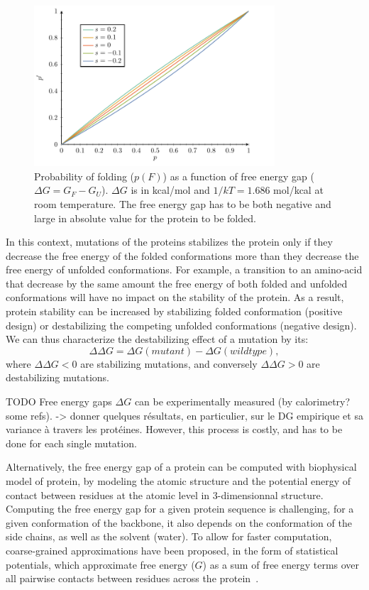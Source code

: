 \begin{figure}[H]
    \centering
    \includegraphics[width=0.8\textwidth, page=5] {figures.pdf}
    \caption[Probability of folding]{
    Probability of folding ($p(F)$) as a function of free energy gap ($\Delta G = G_F - G_U$).
    $\Delta G$ is in kcal/mol and $1/kT=1.686$ mol/kcal at room temperature.
    The free energy gap has to be both negative and large in absolute value for the protein to be folded.
    }
	\label{fig:intro-proba-folding}
\end{figure}

In this context, mutations of the proteins stabilizes the protein only if they decrease the free energy of the folded conformations more than they decrease the free energy of unfolded conformations.
For example, a {transition} to an amino-acid that decrease by the same amount the free energy of both folded and unfolded conformations will have no impact on the stability of the protein.
As a result, protein stability can be increased by stabilizing folded conformation (positive design) or destabilizing the competing unfolded conformations (negative design).
We can thus characterize the destabilizing effect of a mutation by its:
\begin{equation}
    \Delta \Delta G = \Delta G(mutant) - \Delta G(wild type),
\end{equation}
where $\Delta \Delta G <0 $ are stabilizing mutations, and conversely $\Delta \Delta G > 0 $ are destabilizing mutations.

TODO
Free energy gaps $\Delta G$ can be experimentally measured (by calorimetry? some refs).
-> donner quelques résultats, en particulier, sur le DG empirique et sa variance à travers les protéines.
However, this process is costly, and has to be done for each single mutation.

Alternatively, the free energy gap of a protein can be computed with biophysical model of protein, by modeling the atomic structure and the potential energy of contact between residues at the atomic level in 3-dimensionnal structure.
Computing the free energy gap for a given protein sequence is challenging, for a given conformation of the backbone, it also depends on the conformation of the side chains, as well as the solvent (water).
To allow for faster computation, coarse-grained approximations have been proposed, in the form of statistical potentials, which approximate free energy ($G$) as a sum of free energy terms over all pairwise contacts between residues across the protein~\citep{Miyazawa1985}.

